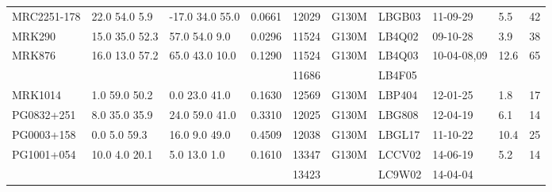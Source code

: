 \documentclass[iop]{emulateapj-rtx4}
\begin{document}
\begin{table}[ht]
\begin{center}
\begin{tabular}{l l l l l l l l l l}
MRC2251-178  	 &   22.0  54.0  5.9  &    -17.0  34.0  55.0  &   0.0661   & 12029  		    &   G130M  &   LBGB03                 & 11-09-29                   &  5.5   &      42         \\
MRK290  			&  15.0  35.0  52.3  &     57.0  54.0  9.0    &    0.0296  & 11524		    &   G130M  &   LB4Q02   		& 09-10-28  		   &   3.9  &      38         \\
MRK876  			&  16.0  13.0  57.2  &    65.0  43.0  10.0   &    0.1290  & 11524		    &   G130M  &   LB4Q03			& 10-04-08,09  		   & 12.6  &      65         \\
				 &			      &				       &		 & 11686		    &		      &   LB4F05			&				   &	       &	  	   \\

MRK1014  		&    1.0  59.0  50.2  &    0.0  23.0  41.0     &    0.1630  & 12569  		    &   G130M  &   LBP404   	 	& 12-01-25  		   &  1.8   &      17         \\
PG0832+251  		&    8.0  35.0  35.9  &    24.0  59.0  41.0   &    0.3310  & 12025  		    &   G130M  &   LBG808			& 12-04-19		   &  6.1   &      14         \\
PG0003+158  		&     0.0  5.0  59.3   &     16.0  9.0  49.0    &    0.4509  & 12038  		    &   G130M  &   LBGL17  		& 11-10-22  		   & 10.4  &      25         \\
PG1001+054  		&    10.0  4.0  20.1  &       5.0  13.0  1.0    &    0.1610  & 13347		    &   G130M  &   LCCV02 		& 14-06-19  		   &  5.2   &      14         \\
				&			      &				       &		 & 13423		    &		      &   LC9W02		& 14-04-04		   &	       &	  	   \\


\end{tabular}
\end{center}
\end{table}
\end{document}
